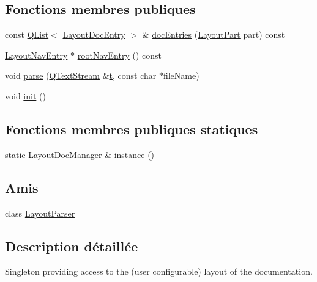\subsection*{Fonctions membres publiques}
\begin{DoxyCompactItemize}
\item 
const \hyperlink{class_q_list}{Q\+List}$<$ \hyperlink{struct_layout_doc_entry}{Layout\+Doc\+Entry} $>$ \& \hyperlink{class_layout_doc_manager_ada1c4dc32df1e43b5f1d9987e68ec974}{doc\+Entries} (\hyperlink{class_layout_doc_manager_aee13a925ea1f915c542ecd7f579ebc94}{Layout\+Part} part) const 
\item 
\hyperlink{struct_layout_nav_entry}{Layout\+Nav\+Entry} $\ast$ \hyperlink{class_layout_doc_manager_afea2ba78b05ae6d721b9b39c24b4ace0}{root\+Nav\+Entry} () const 
\item 
void \hyperlink{class_layout_doc_manager_ade92fd2ccfa31a7bd8b152848d224053}{parse} (\hyperlink{class_q_text_stream}{Q\+Text\+Stream} \&\hyperlink{058__bracket__recursion_8tcl_a69e959f6901827e4d8271aeaa5fba0fc}{t}, const char $\ast$file\+Name)
\item 
void \hyperlink{class_layout_doc_manager_a920748477d4262faf758d21ddbe2329d}{init} ()
\end{DoxyCompactItemize}
\subsection*{Fonctions membres publiques statiques}
\begin{DoxyCompactItemize}
\item 
static \hyperlink{class_layout_doc_manager}{Layout\+Doc\+Manager} \& \hyperlink{class_layout_doc_manager_a87bc2288833b8769bd03e47c58fbba6a}{instance} ()
\end{DoxyCompactItemize}
\subsection*{Amis}
\begin{DoxyCompactItemize}
\item 
class \hyperlink{class_layout_doc_manager_aaa876b66a7f0c8c8766635655c0dff49}{Layout\+Parser}
\end{DoxyCompactItemize}


\subsection{Description détaillée}
Singleton providing access to the (user configurable) layout of the documentation. 

